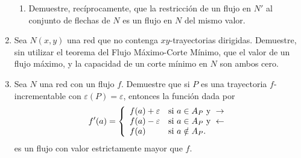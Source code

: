 \documentclass{article}
\begin{document}
\begin{enumerate}
\begin{enumerate}
  \item Demuestre, rec\'iprocamente, que la restricci\'on de un flujo en
    $N'$ al conjunto de flechas de $N$ es un flujo en $N$ del mismo valor.
  \end{enumerate}

\item Sea $N(x,y)$ una red que no contenga $xy$-trayectorias dirigidas.
  Demuestre, sin utilizar el teorema del Flujo M\'aximo-Corte M\'inimo, que el
  valor de un flujo m\'aximo, y la capacidad de un corte m\'inimo en $N$ son
  ambos cero.

\item Sea $N$ una red con un flujo $f$.   Demuestre que si $P$ es una
  trayectoria $f$-incrementable con $\varepsilon (P) = \varepsilon$, entonces
  la funci\'on dada por \[
  f'(a) = \left\{
  \begin{array}{ll}
    f(a) + \varepsilon & \textnormal{si } a \in A_P \text{ y } \to \\
    f(a) - \varepsilon & \textnormal{si } a \in A_P \text{ y }
    \leftarrow \\
    f(a) & \textnormal{si } a \notin A_P.
  \end{array}
  \right.\]
  es un flujo con valor estrictamente mayor que $f$.

\end{enumerate}
\end{document}
